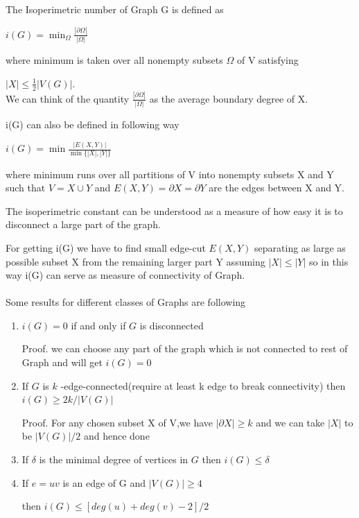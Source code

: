 \documentclass[oneside]{book}
\begin{document}
	
	The Isoperimetric number of Graph G is defined as \par
	\begin{center}
		$i(G)=\min _{\Omega} \frac{|\partial \Omega|}{|\Omega|}$
	\end{center}
	where minimum is taken over all nonempty subsets $\Omega$ of V satisfying\par $|X| \leq \frac{1}{2}|V(G)|$.
	\\           We can think of the quantity  $\frac{|\partial \Omega|}{|\Omega|}$ as the average boundary degree of X. \par
	i(G) can also be defined in following way \par
	\begin{center}
		$i(G)=\min \frac{|E(X, Y)|}{\min \{|X|,|Y|\}}$
	\end{center}
	where minimum runs over all partitions of V into nonempty subsets X and Y such that  $V=X \cup Y$ and $E(X, Y)=\partial X=\partial Y$ are the edges between X and Y.
	\par
	The isoperimetric constant can be understood as a measure of how easy
	it is to disconnect a large part of the graph. \par
	For getting i(G) we have to find small edge-cut $E(X, Y)$ separating as large as possible  subset X from the remaining larger part Y assuming $|X|\leq |Y|$ so in this way i(G) can serve as measure of connectivity of Graph. \\\\
	Some results for different classes of Graphs are following \par
	\begin{enumerate}
		
		
		\item  $i(G)=0$ if and only if $G$ is disconnected \par
		Proof. we can choose  any part of the graph which is not connected to rest of Graph and will get $i(G)=0$ \par
		\item  If $G$ is $k$ -edge-connected(require at least k edge to break connectivity) then $i(G) \geq 2 k /|V(G)|$ \par
		Proof. For any chosen subset X of V,we have  $|\partial X| \geq k$ and we can take $|X|$ to be $|V(G)|/2$ and hence done\par
		\item  If $\delta$ is the minimal degree of vertices in $G$ then $i(G) \leq\delta$ \par
		\item  If   $e=u v$ is   an  edge  of G  and $|V(G)| \geq 4$ \par then  $i(G) \leq [deg(u)+deg(v)-2] / 2$ \par
	\end{enumerate}
	
\end{document}
